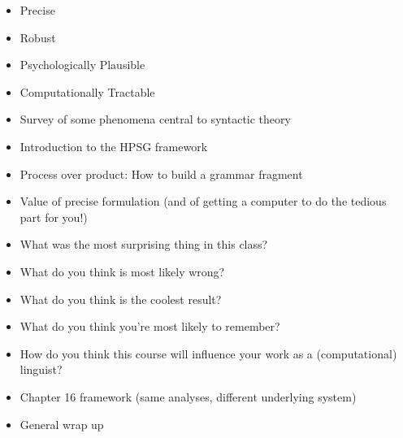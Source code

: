 \documentclass[a4paper,landscape,headrule,footrule,dvips]{foils}
\begin{document}

\begin{itemize}
\item Precise
\item Robust
\item Psychologically Plausible
\item Computationally Tractable
\end{itemize}



\begin{itemize}
\item Survey of some phenomena central to 
syntactic theory
\item Introduction to the HPSG framework
\item Process over product: How to build a 
grammar fragment
\item Value of precise formulation (and of getting 
a computer to do the tedious part for you!)
\end{itemize}


\begin{itemize}
\item What was the most surprising thing in this 
class?
\item What do you think is most likely wrong?
\item What do you think is the coolest result?
\item What do you think you’re most likely to 
remember?
\item How do you think this course will influence 
your work as a (computational) linguist?
\end{itemize}



\begin{itemize}
\item Chapter 16 framework (same analyses, 
different underlying system)
\item General wrap up
\end{itemize}
\end{document}
